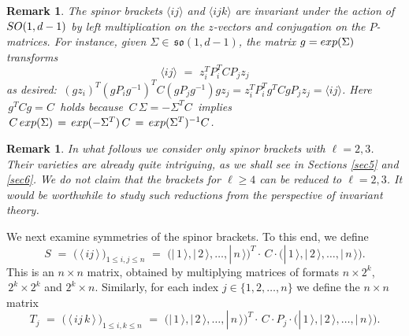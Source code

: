 \documentclass[english]{ourlematema}
\numberwithin{theorem}{section}
\newtheorem{remark}[theorem]{Remark}
\theoremstyle{definition}
\begin{document}
\begin{remark} \label{rmk:bracketsinvariant}
The spinor brackets $\langle i j \rangle$
and $\langle i j k \rangle$ are invariant under the 
 action of ${\rm SO}(1,d-1)$ by
left multiplication on the $z$-vectors and
conjugation on the $P$-matrices. For instance,
given $\Sigma \in \,\mathfrak{so}(1,d-1)$, the matrix
$g = {\rm exp}(\Sigma)$ transforms
    \begin{equation}
    \label{ij bracket}
        \langle ij\rangle \,\,  = \,\, z_i^TP_i^TCP_jz_j
    \end{equation}
    as desired:
$\,        (gz_i)^T(gP_ig^{-1})^T C(gP_jg^{-1})gz_j
        =z_i^TP_i^Tg^TCgP_jz_j = \langle ij \rangle $.
Here $\,g^T C g = C\,$ holds because $\,C\,\Sigma=-\Sigma^TC\,$ implies
 $   \, C\,{\rm exp}(\Sigma)\,=\,{\rm exp}(-\Sigma^T)\,C\,=\,{\rm exp}(\Sigma^T)^{-1}C$.
\end{remark}

\begin{remark}
In what follows we consider only spinor brackets with  $\ell = 2,3$.
Their varieties are already quite intriguing, as we shall see in
Sections \ref{sec5} and \ref{sec6}.
We do not claim that the brackets for $\ell \geq 4$ can be reduced
to $\ell=2,3$. It would be worthwhile to study such reductions from the perspective
of invariant theory.
\end{remark}

We next examine symmetries of the spinor brackets. 
To this end, we define 
\begin{equation} \label{eq:spinormatrix}
    S \, \, = \, \, \bigl(\,\langle \, ij \, \rangle \,\bigr)_{1 \leq i,j \leq n} \, \, = \,\, \bigl(
        | \, 1 \, \rangle , | \, 2 \, \rangle ,   \ldots,       | \, n \,  \rangle
    \bigr)^T \cdot\, C \cdot \bigl(
      | \, 1 \, \rangle , | \, 2 \, \rangle ,   \ldots,       | \, n \,  \rangle \bigr).
\end{equation}
This is an $n \times n$ matrix, obtained by multiplying matrices
of formats $n \times 2^k$, $\,2^k \times 2^k$ and $2^k \times n$.
Similarly, for each index $j \in \{1,2,\ldots,n\}$ we define
the $n \times n$ matrix
\begin{equation} \label{eq:spinormatrix2}
    T_j \, \, = \, \, \bigl(\,\langle \, ij\,k \, \rangle\, \bigr)_{1 \leq i,k\leq n}\, \, = \,\, \bigl(
        | \, 1 \, \rangle , | \, 2 \, \rangle ,   \ldots,       | \, n \,  \rangle
    \bigr)^T \cdot \,C \cdot P_j  \cdot \bigl(
      | \, 1 \, \rangle , | \, 2 \, \rangle ,   \ldots,       | \, n \,  \rangle \bigr).
\end{equation}
\end{document}
